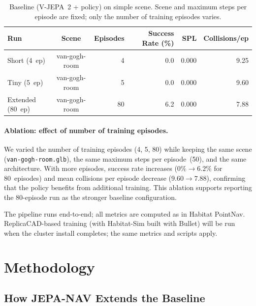 \documentclass{article}
\begin{document}
\begin{table}[htbp]
\centering
\caption{Baseline (V-JEPA~2 + policy) on simple scene. Scene and maximum steps per
  episode are fixed; only the number of training episodes varies.}
\label{tab:baseline}
\begin{tabular}{lcrrrr}
\toprule
\textbf{Run} & \textbf{Scene} & \textbf{Episodes}
  & \textbf{Success Rate (\%)} & \textbf{SPL} & \textbf{Collisions/ep} \\
\midrule
Short (4~ep)    & van-gogh-room &  4 & 0.0 & 0.000 & 9.25 \\
Tiny (5~ep)     & van-gogh-room &  5 & 0.0 & 0.000 & 9.60 \\
Extended (80~ep)& van-gogh-room & 80 & 6.2 & 0.000 & 7.88 \\
\bottomrule
\end{tabular}
\end{table}

\paragraph{Ablation: effect of number of training episodes.}
We varied the number of training episodes (4, 5, 80) while keeping the same scene
(\texttt{van-gogh-room.glb}), the same maximum steps per episode~(50), and the same
architecture. With more episodes, success rate increases ($0\% \to 6.2\%$ for
80~episodes) and mean collisions per episode decrease ($9.60 \to 7.88$), confirming
that the policy benefits from additional training. This ablation supports reporting the
80-episode run as the stronger baseline configuration.

The pipeline runs end-to-end; all metrics are computed as in Habitat PointNav.
ReplicaCAD-based training (with Habitat-Sim built with Bullet) will be run when the
cluster install completes; the same metrics and scripts apply.

\section{Methodology}

\subsection{How JEPA-NAV Extends the Baseline}
\end{document}
